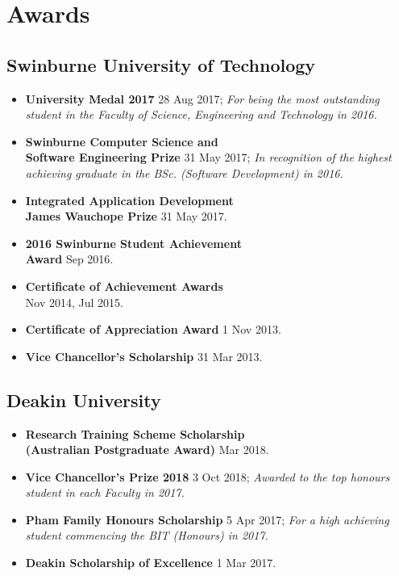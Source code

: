 \vspace{-3mm}
\section{Awards}
\small

\begin{multicols}{2}
\raggedright

\subsection{Swinburne University of Technology}

\begin{itemize}
  \item \textbf{University Medal 2017} 28 Aug 2017; \textit{For being the most outstanding student in the Faculty of Science, Engineering and Technology in 2016.}
  \item \textbf{Swinburne Computer Science and\\
        Software Engineering Prize} 31 May 2017; \textit{In recognition of the highest achieving graduate in the BSc. (Software Development) in 2016.}
  \item \textbf{Integrated Application Development\\
        James Wauchope Prize} 31 May 2017.
  \item \textbf{2016 Swinburne Student Achievement\\Award} Sep 2016.
  \item \textbf{Certificate of Achievement Awards}\\Nov 2014, Jul 2015.
  \item \textbf{Certificate of Appreciation Award} 1 Nov 2013.
  \item \textbf{Vice Chancellor's Scholarship} 31 Mar 2013.
\end{itemize}

\columnbreak

\subsection{Deakin University}

\begin{itemize}
  \item \textbf{Research Training Scheme Scholarship\\
        (Australian Postgraduate Award)} Mar 2018.
  \item \textbf{Vice Chancellor's Prize 2018} 3 Oct 2018; \textit{Awarded to the top honours student in each Faculty in 2017.}
  \item \textbf{Pham Family Honours Scholarship} 5 Apr 2017; \textit{For a high achieving student commencing the BIT (Honours) in 2017.}
  \item \textbf{Deakin Scholarship of Excellence} 1 Mar 2017.
\end{itemize}


\end{multicols}
